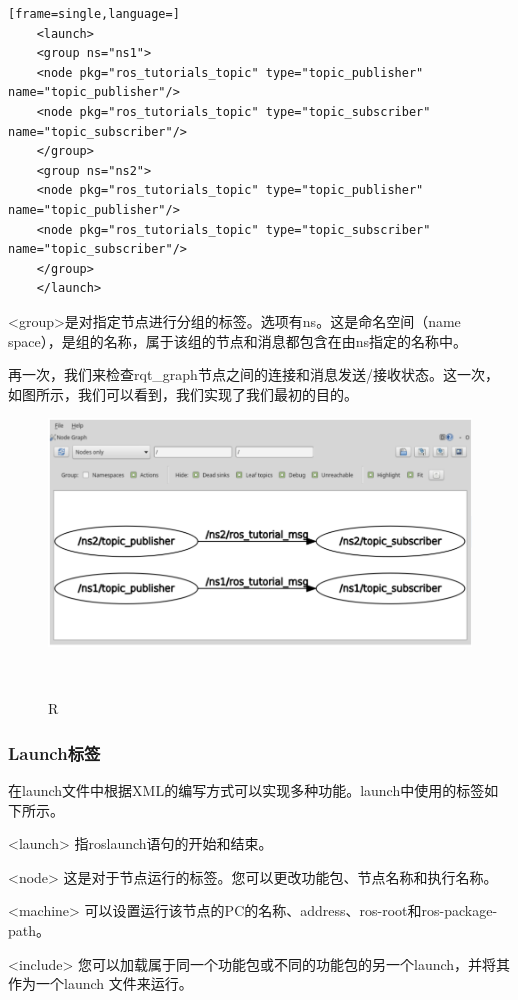 \documentclass[geye,green,kindle,cn]{elegantnote}
\begin{document}
\begin{lstlisting}[frame=single,language=]
    <launch>  
    <group ns="ns1">    
    <node pkg="ros_tutorials_topic" type="topic_publisher" name="topic_publisher"/>    
    <node pkg="ros_tutorials_topic" type="topic_subscriber" name="topic_subscriber"/>  
    </group>  
    <group ns="ns2">    
    <node pkg="ros_tutorials_topic" type="topic_publisher" name="topic_publisher"/>    
    <node pkg="ros_tutorials_topic" type="topic_subscriber" name="topic_subscriber"/>  
    </group> 
    </launch> 
\end{lstlisting}

<group>是对指定节点进行分组的标签。选项有ns。这是命名空间（name space），是组的名称，属于该组的节点和消息都包含在由ns指定的名称中。

再一次，我们来检查rqt_graph节点之间的连接和消息发送/接收状态。这一次，如图所示，我们可以看到，我们实现了我们最初的目的。
\begin{figure}[htbp]
    \centering
    \includegraphics[width=1\linewidth]{src/R.png}
    \centering
    \caption{R} \label{picture:R}
\end{figure}
\subsubsection{Launch标签}
在launch文件中根据XML的编写方式可以实现多种功能。launch中使用的标签如下所示。

<launch> 指roslaunch语句的开始和结束。

<node>  这是对于节点运行的标签。您可以更改功能包、节点名称和执行名称。

<machine>  可以设置运行该节点的PC的名称、address、ros-root和ros-package-path。

<include>   您可以加载属于同一个功能包或不同的功能包的另一个launch，并将其作为一个launch 文件来运行。
\end{document}
